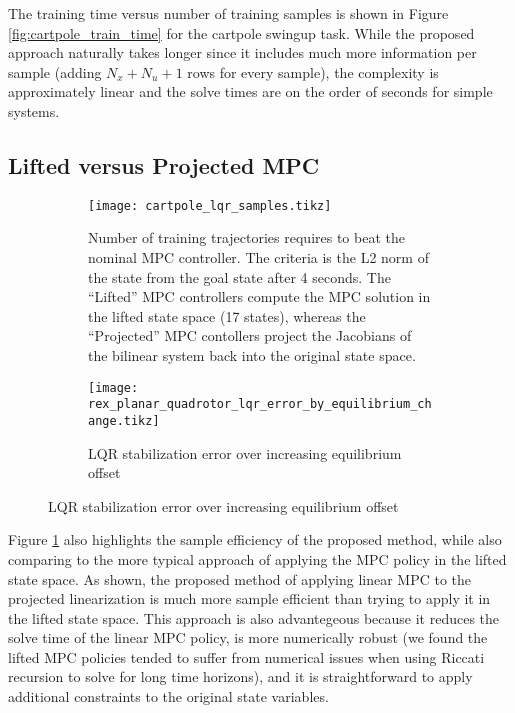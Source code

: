 \documentclass{article}
\begin{document}
The training time versus number of training samples is shown in Figure 
\ref{fig:cartpole_train_time} for the cartpole swingup task. While the proposed approach 
naturally takes longer since it includes much more information per sample (adding 
$N_x + N_u + 1$ rows for every sample), the complexity is approximately linear and the 
solve times are on the order of seconds for simple systems.


\subsection{Lifted versus Projected MPC}
\begin{figure}
  \centering
  \begin{subfigure}[b]{0.50\textwidth}
    \texttt{[image: cartpole\_lqr\_samples.tikz]}
    \caption{Number of training trajectories requires to beat the nominal MPC controller.
    The criteria is the L2 norm of the state from the goal state after 4 seconds.
    The ``Lifted'' MPC controllers compute the MPC solution in the lifted state space 
    (17 states), whereas the ``Projected'' MPC contollers project the Jacobians of the 
    bilinear system back into the original state space.
    }
    \label{fig:cartpole_lqr_samples}
  \end{subfigure}
  \hfill
  \begin{subfigure}[b]{0.48\textwidth}
    \centering
    \texttt{[image: rex\_planar\_quadrotor\_lqr\_error\_by\_equilibrium\_change.tikz]}
    \caption{LQR stabilization error over increasing equilibrium offset}
    \label{fig:rex_planar_quadrotor_lqr_error_by_equilibrium_change}
  \end{subfigure}
\end{figure}
Figure \ref{fig:cartpole_lqr_samples} also highlights the sample efficiency of the proposed 
method, while also comparing to the more typical approach of applying the MPC policy in the 
lifted state space. As shown, the proposed method of applying linear MPC to the projected 
linearization is much more sample efficient than trying to apply it in the lifted state 
space. This approach is also advantegeous because it reduces the solve time of the linear 
MPC policy, is more numerically robust (we found the lifted MPC policies tended to suffer 
from numerical issues when using Riccati recursion to solve for long time horizons), and 
it is straightforward to apply additional constraints to the original state variables.
\end{document}
